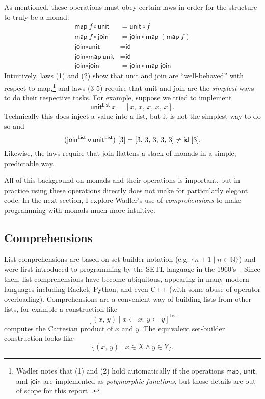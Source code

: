 \documentclass[acmsmall, nonacm, screen]{acmart}
\newcommand{\unit}[2]{\textsf{unit}^{\textsf{#1}}~#2}
\begin{document}
As mentioned, these operations must obey certain laws in order for the structure to truly be a
monad:
\begin{align}
  \textsf{map}~f \circ \textsf{unit} &= \textsf{unit} \circ f \\
  \textsf{map}~f \circ \textsf{join} &= \textsf{join} \circ \textsf{map}~(\textsf{map}~f) \\
  \textsf{join} \circ \textsf{unit} &= \textsf{id} \\
  \textsf{join} \circ \textsf{map}~\textsf{unit} &= \textsf{id} \\
  \textsf{join} \circ \textsf{join} &= \textsf{join} \circ \textsf{map}~\textsf{join}
\end{align}
Intuitively, laws (1) and (2) show that \textsf{unit} and \textsf{join} are ``well-behaved'' with
respect to \textsf{map},\footnote{Wadler notes that (1) and (2) hold automatically if the
operations $\textsf{map}$, $\textsf{unit}$, and $\textsf{join}$ are implemented as {\em
polymorphic functions}, but those details are out of scope for this
report~\cite{wadler1989theorems}.} and laws (3-5) require that \textsf{unit} and \textsf{join}
are the {\em simplest} ways to do their respective tasks. For example, suppose we tried to implement
\[ \unit{List}{x} = [x,\, x,\, x,\, x,\, x]. \]
Technically this does inject a value into a list, but it is not the simplest way to do so and
\[
  (\textsf{join}^{\textsf{List}} \circ \textsf{unit}^{\textsf{List}})~[3] = [3,\, 3,\, 3,\, 3,\, 3] \neq \textsf{id}~[3]. \\
\]
Likewise, the laws require that \textsf{join} flattens a stack of monads in a simple, predictable
way.

All of this background on monads and their operations is important, but in practice using these
operations directly does not make for particularly elegant code. In the next section, I explore
Wadler's use of {\em comprehensions} to make programming with monads much more intuitive.

\subsection{Comprehensions}
List comprehensions are based on set-builder notation (e.g. $\{n + 1 \mid n \in \mathbb{N}\}$)
and were first introduced to programming by the SETL language in the
1960's~\cite{schwartz2012programming}. Since then, list comprehensions have become ubiquitous,
appearing in many modern languages including Racket, Python, and even C++ (with some abuse of
operator overloading). Comprehensions are a convenient way of building lists from other lists,
for example a construction like
\[ [(x,\, y) \mid x \leftarrow \overline{x};\ y \leftarrow \overline{y}]^{\textsf{List}} \]
computes the Cartesian product of $\overline{x}$ and $\overline{y}$. The equivalent set-builder
construction looks like
\[ \{(x,\, y) \mid x \in X \wedge y \in Y\}. \]
\end{document}

